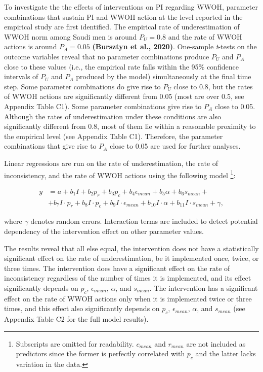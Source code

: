 \documentclass[
  11pt,
]{article}
\begin{document}
To investigate the the effects of interventions on PI regarding WWOH,
parameter combinations that sustain PI and WWOH action at the level
reported in the empirical study are first identified. The empirical rate
of underestimation of WWOH norm among Saudi men is around \(P_U = 0.8\)
and the rate of WWOH actions is around \(P_A = 0.05\) \textbf{(Bursztyn
et al., 2020)}. One-sample \emph{t}-tests on the outcome variables
reveal that no parameter combinations produce \(P_U\) and \(P_A\) close
to these values (i.e., the empirical rate falls within the 95\%
confidence intervals of \(P_U\) and \(P_A\) produced by the model)
simultaneously at the final time step. Some parameter combinations do
give rise to \(P_U\) close to 0.8, but the rates of WWOH actions are
significantly different from 0.05 (most are over 0.5, see Appendix Table
C1). Some parameter combinations give rise to \(P_A\) close to 0.05.
Although the rates of underestimation under these conditions are also
significantly different from 0.8, most of them lie within a reasonable
proximity to the empirical level (see Appendix Table C1). Therefore, the
parameter combinations that give rise to \(P_A\) close to 0.05 are used
for further analyses.

Linear regressions are run on the rate of underestimation, the rate of
inconsistency, and the rate of WWOH actions using the following model
\footnote{Subscripts are omitted for readability. $c_{mean}$ and $r_{mean}$ are not included as predictors since the former is perfectly correlated with $p_c$ and the latter lacks variation in the data.}:

\begin{equation}
  \begin{aligned}
  y &= a + b_1I + b_2p_r + b_3p_c + b_4\epsilon_{mean} + b_5\alpha + b_6s_{mean} +\\
  &+ b_7I \cdot p_r + b_{8}I \cdot p_c + b_{9}I \cdot \epsilon_{mean} + b_{10}I \cdot \alpha + b_{11}I \cdot s_{mean} + \gamma,
  \end{aligned}
\end{equation}

where \(\gamma\) denotes random errors. Interaction terms are included
to detect potential dependency of the intervention effect on other
parameter values.

The results reveal that all else equal, the intervention does not have a
statistically significant effect on the rate of underestimation, be it
implemented once, twice, or three times. The intervention does have a
significant effect on the rate of inconsistency regardless of the number
of times it is implemented, and its effect significantly depends on
\(p_c\), \(\epsilon_{mean}\), \(\alpha\), and \(s_{mean}\). The
intervention has a significant effect on the rate of WWOH actions only
when it is implemented twice or three times, and this effect also
significantly depends on \(p_c\), \(\epsilon_{mean}\), \(\alpha\), and
\(s_{mean}\) (see Appendix Table C2 for the full model results).
\end{document}
